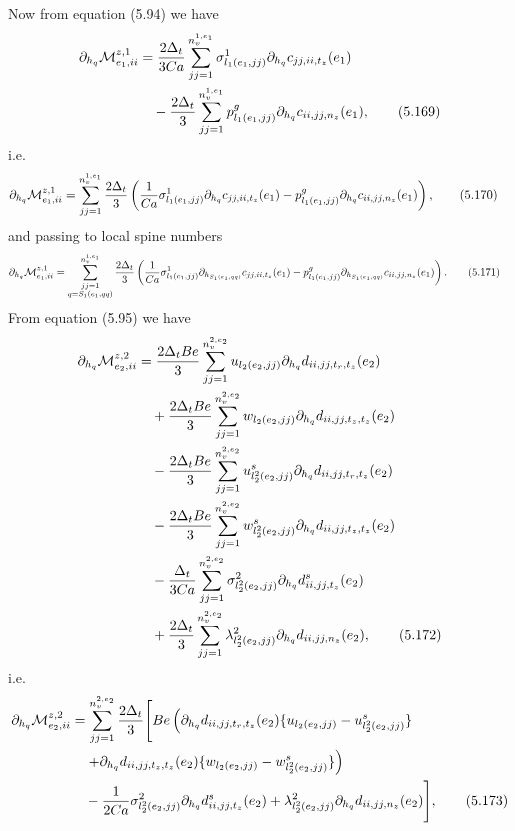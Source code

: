 \documentclass{article}
\begin{document}
Now from equation (5.94) we have
\begin{align}
\partial_{h_q}\mathcal{M}_{e_1,ii}^{z,1} &= \frac{2\Delta_t}{3Ca} \sum_{jj=1}^{n_v^{1,e_1}} \sigma_{l_1(e_1,jj)}^1 \partial_{h_q} c_{jj,ii,t_z}(e_1) \nonumber\\
&\quad - \frac{2\Delta_t}{3} \sum_{jj=1}^{n_v^{1,e_1}} p_{l_1(e_1,jj)}^g \partial_{h_q} c_{ii,jj,n_z}(e_1), \tag{5.169}
\end{align}
i.e.
\begin{align}
\partial_{h_q}\mathcal{M}_{e_1,ii}^{z,1} &= \sum_{jj=1}^{n_v^{1,e_1}} \frac{2\Delta_t}{3} \left( \frac{1}{Ca} \sigma_{l_1(e_1,jj)}^1 \partial_{h_q} c_{jj,ii,t_z}(e_1) - p_{l_1(e_1,jj)}^g \partial_{h_q} c_{ii,jj,n_z}(e_1) \right), \tag{5.170}
\end{align}
and passing to local spine numbers
\begin{align}
\partial_{h_q}\mathcal{M}_{e_1,ii}^{z,1} &= \sum_{\substack{jj=1\\ q=S_1(e_1,qq)}}^{n_v^{1,e_1}} \frac{2\Delta_t}{3} \left( \frac{1}{Ca} \sigma_{l_1(e_1,jj)}^1 \partial_{h_{S_1(e_1,qq)}} c_{jj,ii,t_z}(e_1) - p_{l_1(e_1,jj)}^g \partial_{h_{S_1(e_1,qq)}} c_{ii,jj,n_z}(e_1) \right). \tag{5.171}
\end{align}
From equation (5.95) we have
\begin{align}
\partial_{h_q}\mathcal{M}_{e_2,ii}^{z,2} &= \frac{2\Delta_t Be}{3} \sum_{jj=1}^{n_v^{2,e_2}} u_{l_2(e_2,jj)} \partial_{h_q} d_{ii,jj,t_r,t_z}(e_2) \nonumber\\
&\quad + \frac{2\Delta_t Be}{3} \sum_{jj=1}^{n_v^{2,e_2}} w_{l_2(e_2,jj)} \partial_{h_q} d_{ii,jj,t_z,t_z}(e_2) \nonumber\\
&\quad - \frac{2\Delta_t Be}{3} \sum_{jj=1}^{n_v^{2,e_2}} u_{l_2^2(e_2,jj)}^s \partial_{h_q} d_{ii,jj,t_r,t_z}(e_2) \nonumber\\
&\quad - \frac{2\Delta_t Be}{3} \sum_{jj=1}^{n_v^{2,e_2}} w_{l_2^2(e_2,jj)}^s \partial_{h_q} d_{ii,jj,t_z,t_z}(e_2) \nonumber\\
&\quad - \frac{\Delta_t}{3Ca} \sum_{jj=1}^{n_v^{2,e_2}} \sigma_{l_2^2(e_2,jj)}^2 \partial_{h_q} d_{ii,jj,t_z}^s(e_2) \nonumber\\
&\quad + \frac{2\Delta_t}{3} \sum_{jj=1}^{n_v^{2,e_2}} \lambda_{l_2^2(e_2,jj)}^2 \partial_{h_q} d_{ii,jj,n_z}(e_2), \tag{5.172}
\end{align}
i.e.
\begin{align}
\partial_{h_q}\mathcal{M}_{e_2,ii}^{z,2} &= \sum_{jj=1}^{n_v^{2,e_2}} \frac{2\Delta_t}{3} \Bigg[ Be \left( \partial_{h_q} d_{ii,jj,t_r,t_z}(e_2) \{ u_{l_2(e_2,jj)} - u_{l_2^2(e_2,jj)}^s \} \right. \nonumber\\
&\quad \left. + \partial_{h_q} d_{ii,jj,t_z,t_z}(e_2) \{ w_{l_2(e_2,jj)} - w_{l_2^2(e_2,jj)}^s \} \right) \nonumber\\
&\quad - \frac{1}{2Ca} \sigma_{l_2^2(e_2,jj)}^2 \partial_{h_q} d_{ii,jj,t_z}^s(e_2) + \lambda_{l_2^2(e_2,jj)}^2 \partial_{h_q} d_{ii,jj,n_z}(e_2) \Bigg], \tag{5.173}
\end{align}
\end{document}
